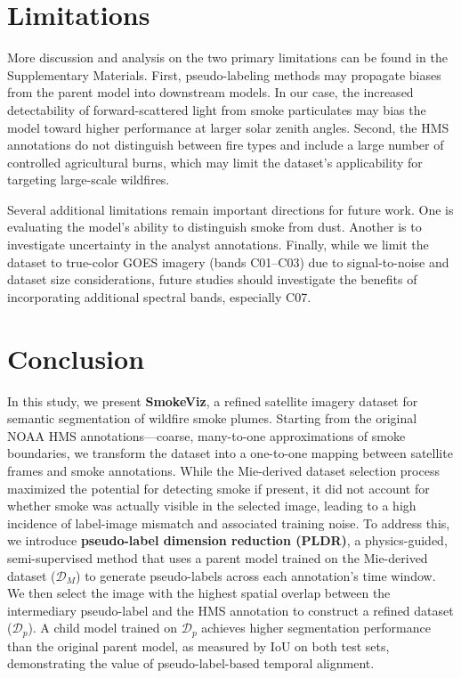 \documentclass{article}
\begin{document}
\section{Limitations}

More discussion and analysis on the two primary limitations can be found in the Supplementary Materials. First, pseudo-labeling methods may propagate biases from the parent model into downstream models. In our case, the increased detectability of forward-scattered light from smoke particulates may bias the model toward higher performance at larger solar zenith angles. Second, the HMS annotations do not distinguish between fire types and include a large number of controlled agricultural burns, which may limit the dataset’s applicability for targeting large-scale wildfires.

Several additional limitations remain important directions for future work. One is evaluating the model’s ability to distinguish smoke from dust. Another is to investigate uncertainty in the analyst annotations. Finally, while we limit the dataset to true-color GOES imagery (bands C01–C03) due to signal-to-noise and dataset size considerations, future studies should investigate the benefits of incorporating additional spectral bands, especially C07. 

\section{Conclusion}

In this study, we present \textbf{SmokeViz}, a refined satellite imagery dataset for semantic segmentation of wildfire smoke plumes. Starting from the original NOAA HMS annotations—coarse, many-to-one approximations of smoke boundaries, we transform the dataset into a one-to-one mapping between satellite frames and smoke annotations. While the Mie-derived dataset selection process maximized the potential for detecting smoke if present, it did not account for whether smoke was actually visible in the selected image, leading to a high incidence of label-image mismatch and associated training noise. To address this, we introduce \textbf{pseudo-label dimension reduction (PLDR)}, a physics-guided, semi-supervised method that uses a parent model trained on the Mie-derived dataset (\(\mathcal{D}_M\)) to generate pseudo-labels across each annotation’s time window. We then select the image with the highest spatial overlap between the intermediary pseudo-label and the HMS annotation to construct a refined dataset (\(\mathcal{D}_p\)). A child model trained on \(\mathcal{D}_p\) achieves higher segmentation performance than the original parent model, as measured by IoU on both test sets, demonstrating the value of pseudo-label-based temporal alignment.
\end{document}
